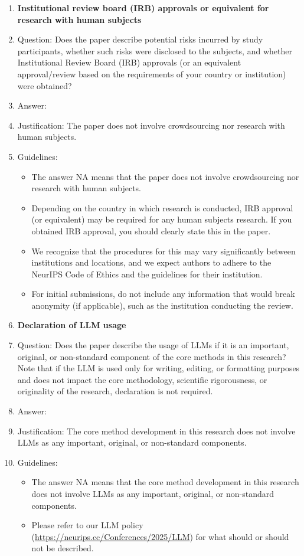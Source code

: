 \documentclass{article}
\numberwithin{equation}{section}
\theoremstyle{definition}
\begin{document}
\begin{enumerate}
\item {\bf Institutional review board (IRB) approvals or equivalent for research with human subjects}
    \item[] Question: Does the paper describe potential risks incurred by study participants, whether such risks were disclosed to the subjects, and whether Institutional Review Board (IRB) approvals (or an equivalent approval/review based on the requirements of your country or institution) were obtained?
    \item[] Answer: \answerNA{} %
    \item[] Justification: The paper does not involve crowdsourcing nor research with human subjects.
    \item[] Guidelines:
    \begin{itemize}
        \item The answer NA means that the paper does not involve crowdsourcing nor research with human subjects.
        \item Depending on the country in which research is conducted, IRB approval (or equivalent) may be required for any human subjects research. If you obtained IRB approval, you should clearly state this in the paper. 
        \item We recognize that the procedures for this may vary significantly between institutions and locations, and we expect authors to adhere to the NeurIPS Code of Ethics and the guidelines for their institution. 
        \item For initial submissions, do not include any information that would break anonymity (if applicable), such as the institution conducting the review.
    \end{itemize}

\item {\bf Declaration of LLM usage}
    \item[] Question: Does the paper describe the usage of LLMs if it is an important, original, or non-standard component of the core methods in this research? Note that if the LLM is used only for writing, editing, or formatting purposes and does not impact the core methodology, scientific rigorousness, or originality of the research, declaration is not required.
    \item[] Answer: \answerNA{} %
    \item[] Justification: The core method development in this research does not involve LLMs as any important, original, or non-standard components.
    \item[] Guidelines:
    \begin{itemize}
        \item The answer NA means that the core method development in this research does not involve LLMs as any important, original, or non-standard components.
        \item Please refer to our LLM policy (\url{https://neurips.cc/Conferences/2025/LLM}) for what should or should not be described.
    \end{itemize}

\end{enumerate}
\end{document}

